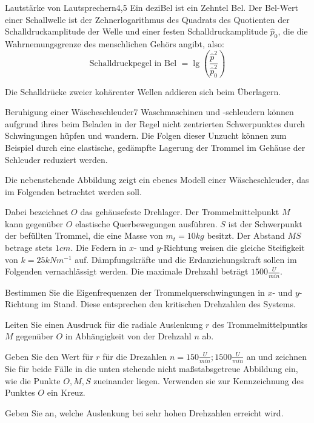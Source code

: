 \begin{problem}{Lautstärke von Lautsprechern}{4,5}
\hinweis Ein deziBel ist ein Zehntel Bel.  Der Bel-Wert einer Schallwelle ist der Zehnerlogarithmus des Quadrats des Quotienten der Schalldruckamplitude der Welle und einer festen Schalldruckamplitude $\hat{p}_0$, die die Wahrnemungsgrenze des menschlichen Gehörs angibt, also:
\begin{equation*}
  \mbox{Schalldruckpegel in Bel\ } = \lg\left(\frac{\hat{p}^2}{\hat{p}_0^2}\right)
\end{equation*}

Die Schalldrücke zweier kohärenter Wellen addieren sich beim Überlagern.
\begin{solution}
  
\end{solution}
\end{problem}

\begin{problem}{Beruhigung einer Wäscheschleuder}{7}
  Waschmaschinen und -schleudern können aufgrund ihres beim Beladen in der Regel nicht zentrierten Schwerpunktes durch Schwingungen hüpfen und wandern.  Die Folgen dieser Unzucht können zum Beispiel durch eine elastische, gedämpfte Lagerung der Trommel im Gehäuse der Schleuder reduziert werden.

Die nebenstehende Abbildung zeigt ein ebenes Modell einer Wäscheschleuder, das im Folgenden betrachtet werden soll.


Dabei bezeichnet $O$ das gehäusefeste Drehlager.  Der Trommelmittelpunkt $M$ kann gegenüber $O$ elastische Querbewegungen ausführen.  $S$ ist der Schwerpunkt der befüllten Trommel, die eine Masse von $m_t=10\unit{kg}$ besitzt.  Der Abstand $MS$ betrage stets $1\unit{cm}$.  Die Federn in $x$- und $y$-Richtung weisen die gleiche Steifigkeit von $k=25\unit{kNm^{-1}}$ auf.  Dämpfungskräfte und die Erdanziehungskraft sollen im Folgenden vernachlässigt werden.  Die maximale Drehzahl beträgt $1500\unit{\frac U{min}}$.

\begin{abcenum}
  \item Bestimmen Sie die Eigenfrequenzen der Trommelquerschwingungen in $x$- und $y$-Richtung im Stand.  Diese entsprechen den kritischen Drehzahlen des Systems.
\item Leiten Sie einen Ausdruck für die radiale Auslenkung $r$ des Trommelmittelpuntks $M$ gegenüber $O$ in Abhängigkeit von der Drehzahl $n$ ab.
\item Geben Sie den Wert für $r$ für die Drezahlen $n=150\unit{\frac{U}{min}}; 1500\unit{\frac{U}{min}}$ an und zeichnen Sie für beide Fälle in die unten stehende nicht maßstabsgetreue Abbildung ein, wie die Punkte $O, M, S$ zueinander liegen.  Verwenden sie zur Kennzeichnung des Punktes $O$ ein Kreuz.
\item Geben Sie an, welche Auslenkung bei sehr hohen Drehzahlen erreicht wird.
\end{abcenum}


\end{problem}
